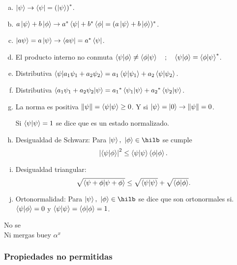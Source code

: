          \begin{enumerate}[a)]
             \item $\ket{\psi}\rightarrow\bra{\psi}=\qty(\ket{\psi})^*$.
             \item $a\ket{\psi}+b\ket{\phi}\rightarrow a^*\bra{\psi}+b^*\bra{\phi}=(a\ket{\psi}+b\ket{\phi})^*$.
             \item $\ket{a\psi}=a\ket{\psi}\rightarrow\bra{a\psi}=a^*\bra{\psi}$.
             \item El producto interno no conmuta  $\braket{\psi}{\phi}\not=\braket{\phi}{\psi}\qq{;}\braket{\psi}{\phi}=\braket{\phi}{\psi}^*$.
             \item Distributiva $\braket{\psi}{a_1\psi_1+a_2\psi_2}=a_1\braket{\psi}{\psi_1}+a_2\braket{\psi}{\psi_2}$.
             \item Distributiva $\braket{a_1\psi_1+a_2\psi_2}{\psi}={a_1}^*\braket{\psi_1}{\psi}+{a_2}^*\braket{\psi_2}{\psi}$.

             \item La norma es positiva $\norm{\psi}=\braket{\psi}\geq0$. Y si $\ket{\psi}=\ket{0}\rightarrow\norm{\psi}=0$.

                   Si $\braket{\psi}=1$ se dice que es un estado normalizado.

             \item Desigualdad de Schwarz: Para $\ket{\psi},~\ket{\phi}\in\hilb$ se cumple
                   \[ \abs{\braket{\psi}{\phi}}^2\leq\braket{\psi}\braket{\phi}. \]
             \item Desigualdad triangular:
                   \[ \sqrt{\braket{\psi+\phi}}\leq\sqrt{\braket{\psi}}+\sqrt{\braket{\phi}}. \]
             \item Ortonormalidad: Para $\ket{\psi},~\ket{\phi}\in\hilb$ se dice que son ortonormales si. $\braket{\psi}{\phi}=0$ y $\braket{\psi}=\braket{\phi}=1$.

         \end{enumerate}

         \begin{example}
             No se\\
             Ni mergas buey $\alpha^x$
         \end{example}

     \subsubsection{Propiedades no permitidas}


